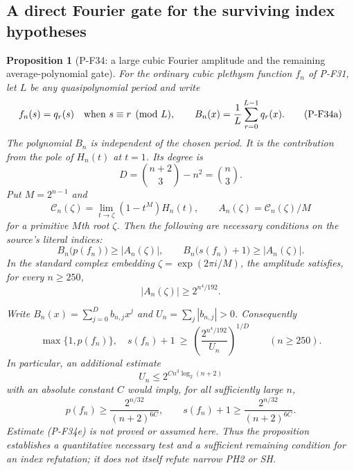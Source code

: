 \documentclass[11pt,a4paper]{article}
\newtheorem{proposition}{Proposition}[section]
\begin{document}
\subsection{A direct Fourier gate for the surviving index hypotheses}

\begin{proposition}[P-F34: a large cubic Fourier amplitude and the remaining average-polynomial gate]
\label{prop:cubicfourierindexgate}
For the ordinary cubic plethysm function $f_n$ of P-F31, let
$L$ be any quasipolynomial period and write
\[
 f_n(s)=q_r(s)\quad\hbox{when }s\equiv r\pmod L,
 \qquad
 B_n(x)=\frac1L\sum_{r=0}^{L-1}q_r(x).
 \tag{P-F34a}
\]
The polynomial $B_n$ is independent of the chosen period.
It is the contribution from the pole of $H_n(t)$ at $t=1$.
Its degree is
\[
 D=\binom{n+2}{3}-n^2=\binom n3.
\]
Put $M=2^{n-1}$ and
\[
 \mathcal C_n(\zeta)=\lim_{t\to\zeta}(1-t^M)H_n(t),
 \qquad A_n(\zeta)=\mathcal C_n(\zeta)/M
\]
for a primitive $M$th root $\zeta$. Then the following are
necessary conditions on the source's literal indices:
\[
 B_n\bigl(p(f_n)\bigr)\ge |A_n(\zeta)|,
 \qquad
 B_n\bigl(s(f_n)+1\bigr)\ge |A_n(\zeta)|.
 \tag{P-F34b}
\]
In the standard complex embedding
$\zeta=\exp(2\pi i/M)$, the amplitude satisfies, for every
$n\ge250$,
\[
                         |A_n(\zeta)|\ge2^{n^4/192}.
 \tag{P-F34c}
\]

Write $B_n(x)=\sum_{j=0}^{D}b_{n,j}x^j$ and
$U_n=\sum_j|b_{n,j}|>0$. Consequently
\[
 \max\{1,p(f_n)\},\quad s(f_n)+1
      \ \ge\ \left(\frac{2^{n^4/192}}{U_n}\right)^{1/D}
       \qquad(n\ge250).
 \tag{P-F34d}
\]
In particular, an additional estimate
\[
 U_n\le2^{C n^3\log_2(n+2)}
 \tag{P-F34e}
\]
with an absolute constant $C$ would imply, for all sufficiently
large $n$,
\[
 p(f_n)\ge\frac{2^{n/32}}{(n+2)^{6C}},\qquad
 s(f_n)+1\ge\frac{2^{n/32}}{(n+2)^{6C}}.
 \tag{P-F34f}
\]
Estimate (P-F34e) is not proved or assumed here. Thus the
proposition establishes a quantitative necessary test and
a sufficient remaining condition for an index refutation;
it does not itself refute narrow PH2 or SH.
\end{proposition}
\end{document}
